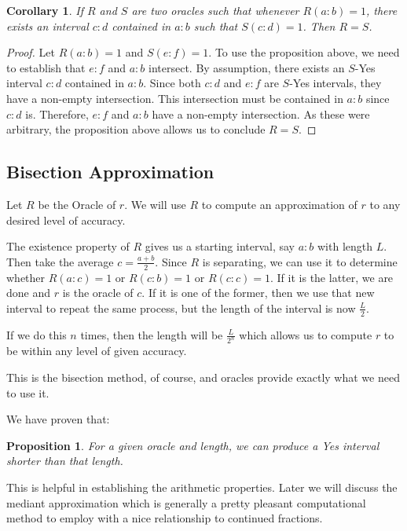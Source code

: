 \documentclass[12pt]{article}
\newtheorem{corollary}{Corollary}[subsection]
\newtheorem{proposition}{Proposition}[subsection]
\theoremstyle{remark}
\begin{document}
\begin{corollary}
    If $R$ and $S$ are two oracles such that whenever $R(a:b) = 1$, there exists an interval $c:d$ contained in $a:b$ such that $S(c:d) = 1$. Then $R=S$.
\end{corollary}

\begin{proof}
Let $R(a:b)=1$ and $S(e:f) = 1$. To use the proposition above, we need to establish that $e:f$ and $a:b$ intersect. By assumption, there exists an $S$-Yes interval $c:d$ contained in $a:b$. Since both $c:d$ and $e:f$ are $S$-Yes intervals, they have a non-empty intersection. This intersection must be contained in $a:b$ since $c:d$ is. Therefore, $e:f$ and $a:b$ have a non-empty intersection. As these were arbitrary, the proposition above allows us to conclude $R=S$.
\end{proof}


\subsection{Bisection Approximation}

Let $R$ be the Oracle of $r$. We will use $R$ to compute an approximation of $r$ to any desired level of accuracy. 

The existence property of $R$ gives us a starting interval, say $a:b$ with length $L$. Then take the average $c = \frac{a+b}{2}$. Since $R$ is separating, we can use it to determine whether $R(a:c) = 1$ or $R(c:b) = 1$ or $R(c:c) = 1$. If it is the latter, we are done and $r$  is the oracle of $c$. If it is one of the former, then we use that new interval to repeat the same process, but the length of the interval is now $\frac{L}{2}$. 

If we do this $n$ times, then the length will be $\frac{L}{2^n}$ which allows us to compute $r$ to be within any level of given accuracy. 

This is the bisection method, of course, and oracles provide exactly what we need to use it. 

We have proven that: 

\begin{proposition}\label{pr:short}
For a given oracle and length, we can produce a Yes interval shorter than that length. 
\end{proposition}

This is helpful in establishing the arithmetic properties. Later we will discuss the mediant approximation which is generally a pretty pleasant computational method to employ with a nice relationship to continued fractions. 
\end{document}
